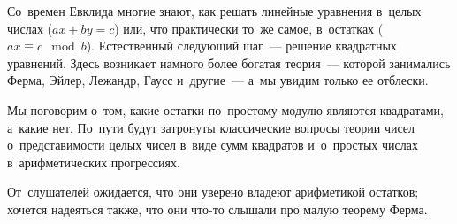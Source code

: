 



Со~времен Евклида многие знают, как решать линейные уравнения в~целых числах
($a x + b y = c$) или, что практически то~же самое, в~остатках
($a x \equiv c \mod{b}$).
Естественный следующий шаг~--- решение квадратных уравнений.
Здесь возникает намного более богатая теория~--- которой занимались Ферма,
Эйлер, Лежандр, Гаусс и~другие~--- а~мы увидим только ее отблески.

Мы поговорим о~том, какие остатки по~простому модулю являются квадратами,
а~какие нет.
По~пути будут затронуты классические вопросы теории чисел о~представимости
целых чисел в~виде сумм квадратов и~о~простых числах в~арифметических
прогрессиях.

От~слушателей ожидается, что они уверено владеют арифметикой остатков;
хочется надеяться также, что они что-то слышали про малую теорему Ферма.

